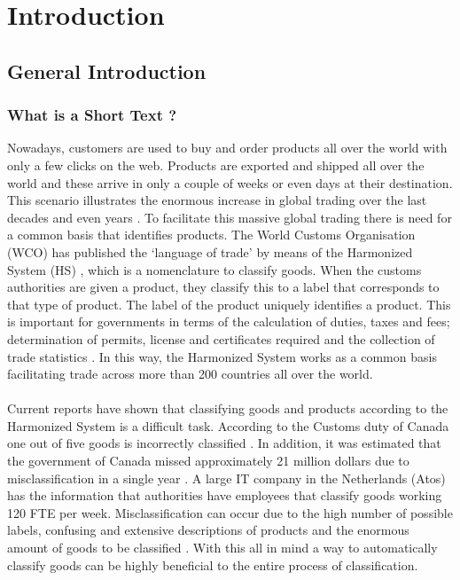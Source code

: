\chapter{Introduction}\label{ch:intro}
\section{General Introduction}
\subsection{What is a Short Text ?}

Nowadays, customers are used to buy and order products all over the world with only a few clicks on the web. Products are exported and shipped all over the world and these arrive in only a couple of weeks or even days at their destination. This scenario illustrates the enormous increase in global trading over the last decades \cite{EstebanOrtiz-Ospina2018OurGlobalization} and even years \cite{WorldTradeOrganization2019World2019}. To facilitate this massive global trading there is need for a common basis that identifies products. The World Customs Organisation (WCO) has published the ‘language of trade’ by means of the Harmonized System (HS) \cite{WorldOrganization}, which is a nomenclature to classify goods. When the customs authorities are given a product, they classify this to a label that corresponds to that type of product. The label of the product uniquely identifies a product. This is important for governments in terms of the calculation of duties, taxes and fees; determination of permits, license and certificates required and the collection of trade statistics \cite{Ding2015}. In this way, the Harmonized System works as a common basis facilitating trade across more than 200 countries all over the world.\\
\\
Current reports have shown that classifying goods and products according to the Harmonized System is a difficult task. According to the Customs duty of Canada one out of five goods is incorrectly classified \cite{AuditorGeneralofCanada2017}. In addition, it was estimated that the government of Canada missed approximately 21 million dollars due to misclassification in a single year \cite{AuditorGeneralofCanada2017}. A large IT company in the Netherlands (Atos) has the information that authorities have employees that classify goods working 120 FTE per week. Misclassification can occur due to the high number of possible labels, confusing and extensive descriptions of products and the enormous amount of goods to be classified \cite{Kappler2011ReversingPayments}. With this all in mind a way to automatically classify goods can be highly beneficial to the entire process of classification.\\
